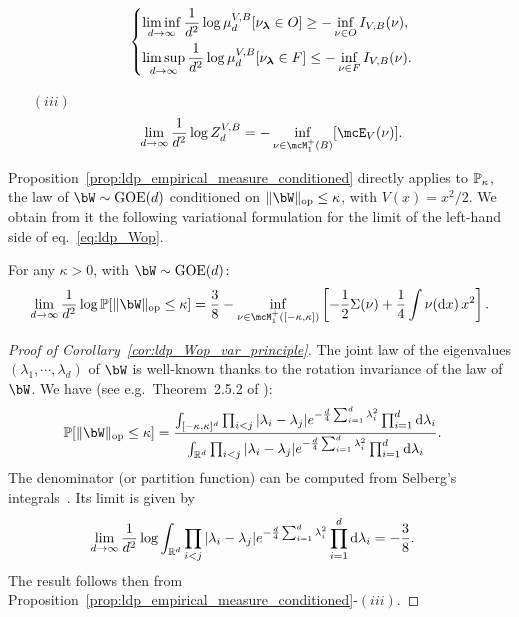 \begin{proposition}
\begin{itemize}
\begin{equation*}
\begin{dcases}
                \liminf_{d\to\infty} \frac{1}{d^2} \log \mu_d^{V,B}[\nu_{\boldsymbol{\lambda}} \in O] \geq - \inf_{\nu \in O} I_{V,B}(\nu), \\
                \limsup_{d\to\infty} \frac{1}{d^2} \log \mu_d^{V,B}[\nu_{\boldsymbol{\lambda}} \in F] \leq - \inf_{\nu \in F} I_{V,B}(\nu).
            \end{dcases}
        \end{equation*}
        \item[$(iii)$] 
        \begin{equation*}
            \lim_{d \to \infty} \frac{1}{d^2} \log Z_d^{V,B} = - \inf_{\nu \in \mcM_1^+(B)}[\mcE_V(\nu)].
        \end{equation*}
    \end{itemize}
\end{proposition}
\noindent
 Proposition~\ref{prop:ldp_empirical_measure_conditioned} directly applies to $\mathbb{P}_\kappa$, the law of $\bW \sim \GOE(d)$ conditioned on $\|\bW\|_\op \leq \kappa$, 
 with $V(x) = x^2/2$. We obtain from it the following variational formulation for the limit of the left-hand side of eq.~\eqref{eq:ldp_Wop}.
 \begin{corollary}\label{cor:ldp_Wop_var_principle}
    For any $\kappa > 0$, with $\bW \sim \GOE(d)$:
    \begin{equation*}
        \lim_{d \to \infty} \frac{1}{d^2} \log \bbP[\|\bW\|_\op \leq \kappa] = \frac{3}{8} - \inf_{\nu \in \mcM_1^+([-\kappa,\kappa])} \left[-\frac{1}{2} \Sigma(\nu) + \frac{1}{4} \int \nu(\rd x) \, x^2\right].
    \end{equation*}
 \end{corollary}
 \begin{proof}[Proof of Corollary~\ref{cor:ldp_Wop_var_principle}]
    The joint law of the eigenvalues $(\lambda_1, \cdots, \lambda_d)$ of $\bW$ is well-known thanks to the rotation invariance of the law of $\bW$. 
We have (see e.g.\ Theorem~2.5.2 of \cite{anderson2010introduction}):
\begin{align}\label{eq:joint_law_evalues}
    \bbP[\|\bW\|_\op \leq \kappa] &= \frac{\int_{[-\kappa,\kappa]^d} \prod_{i < j} |\lambda_i - \lambda_j| e^{-\frac{d}{4} \sum_{i=1}^d \lambda_i^2} \prod_{i=1}^d \rd \lambda_i}{\int_{\bbR^d} \prod_{i < j} |\lambda_i - \lambda_j| e^{-\frac{d}{4} \sum_{i=1}^d \lambda_i^2} \prod_{i=1}^d \rd \lambda_i}.
\end{align}
The denominator (or partition function) can be computed from Selberg's integrals~\citep{mehta2014random}.
Its limit is given by
\begin{align}\label{eq:part_function_selberg}
    \lim_{d \to \infty} \frac{1}{d^2} \log \int_{\mathbb{R}^d} \prod_{i < j} |\lambda_i - \lambda_j| e^{-\frac{d}{4} \sum_{i=1}^d \lambda_i^2} \prod_{i=1}^d \mathrm{d} \lambda_i 
    &= - \frac{3}{8}.
\end{align}
The result follows then from Proposition~\ref{prop:ldp_empirical_measure_conditioned}-$(iii)$.
 \end{proof}

